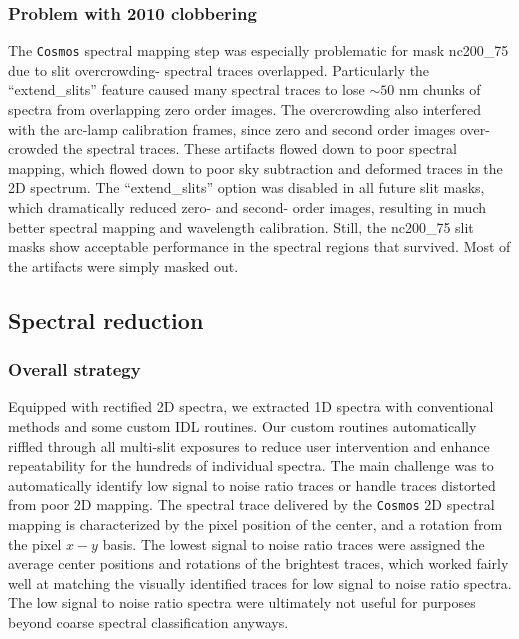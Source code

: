 \subsubsection{Problem with 2010 clobbering}
The \texttt{Cosmos} spectral mapping step was especially problematic for mask nc200\_75 due to slit overcrowding- spectral traces overlapped.  Particularly the ``extend\_slits'' feature caused many spectral traces to lose $\sim50$ nm chunks of spectra from overlapping zero order images.  The overcrowding also interfered with the arc-lamp calibration frames, since zero and second order images over-crowded the spectral traces.  These artifacts flowed down to poor spectral mapping, which flowed down to poor sky subtraction and deformed traces in the 2D spectrum.  The ``extend\_slits'' option was disabled in all future slit masks, which dramatically reduced zero- and second- order images, resulting in much better spectral mapping and wavelength calibration.  Still, the nc200\_75 slit masks show acceptable performance in the spectral regions that survived.  Most of the artifacts were simply masked out.

\subsection{Spectral reduction}

\subsubsection{Overall strategy}
Equipped with rectified 2D spectra, we extracted 1D spectra with conventional methods and some custom IDL routines.  Our custom routines automatically riffled through all multi-slit exposures to reduce user intervention and enhance repeatability for the hundreds of individual spectra.  The main challenge was to automatically identify low signal to noise ratio traces or handle traces distorted from poor 2D mapping.  The spectral trace delivered by the \texttt{Cosmos} 2D spectral mapping is characterized by the pixel position of the center, and a rotation from the pixel $x-y$ basis.  The lowest signal to noise ratio traces were assigned the average center positions and rotations of the brightest traces, which worked fairly well at matching the visually identified traces for low signal to noise ratio spectra.  The low signal to noise ratio spectra were ultimately not useful for purposes beyond coarse spectral classification anyways.

